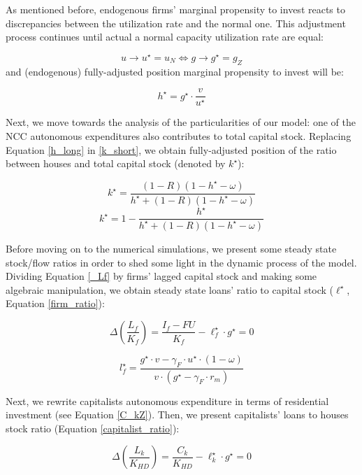 \documentclass[11pt]{article}
\begin{document}
As mentioned before, endogenous firms’ marginal propensity to invest reacts to discrepancies between the utilization rate and the normal one.  This adjustment process continues until actual a normal capacity utilization rate are equal:

$$
u \to u^{\star}  = u_N \Leftrightarrow g \to g^{\star} = g_Z
$$
and (endogenous) fully-adjusted position marginal propensity to invest will be:


\begin{equation}
\label{h_long}
h^{\star} = g^{\star}\cdot \frac{v}{u^{\star}}
\end{equation}

Next, we move towards the analysis of the particularities of our model:  one of the NCC autonomous expenditures also contributes to total capital stock.  
Replacing Equation \ref{h_long} in \ref{k_short}, we obtain fully-adjusted position of the ratio between houses and total capital stock (denoted by \(k^\star\)):

$$
k^{\star} = \frac{(1-R)(1-h^\star - \omega)}{h^\star + (1-R)(1-h^\star - \omega)}
$$
\begin{equation}
\label{k_long}
k^{\star} = 1 - \frac{h^{\star}}{h^\star + (1-R)(1-h^\star - \omega)}
\end{equation}



Before moving on to the numerical simulations, we present some steady state stock/flow ratios in order to shed some light in the dynamic process of the model. Dividing Equation \ref{_Lf} by firms' lagged capital stock and making some algebraic manipulation, we obtain steady state loans' ratio to capital stock (\(\ell^{\star}\), Equation \ref{firm_ratio}):

$$
\Delta \left(\frac{L_{f}}{K_{f}}\right) = \frac{I_{f} - FU}{K_{f}} - \ell^{\star}_{f}\cdot g^{\star}  = 0
$$


\begin{equation}
\label{firm_ratio}
l^\star_f = \frac{g^\star\cdot v - \gamma_F\cdot u^\star \cdot (1-\omega)}{v\cdot (g^\star - \gamma_F\cdot r_m)}
\end{equation}

Next, we rewrite capitalists autonomous expenditure in terms of residential investment (see Equation \ref{C_kZ}). 
Then, we  present capitalists' loans to houses stock ratio (Equation \ref{capitalist_ratio}):

$$
\Delta \left(\frac{L_k}{K_{HD}}\right) = \frac{C_k}{K_{HD}} - \ell^{\star}_{k}\cdot g^{\star} = 0
$$
\end{document}
